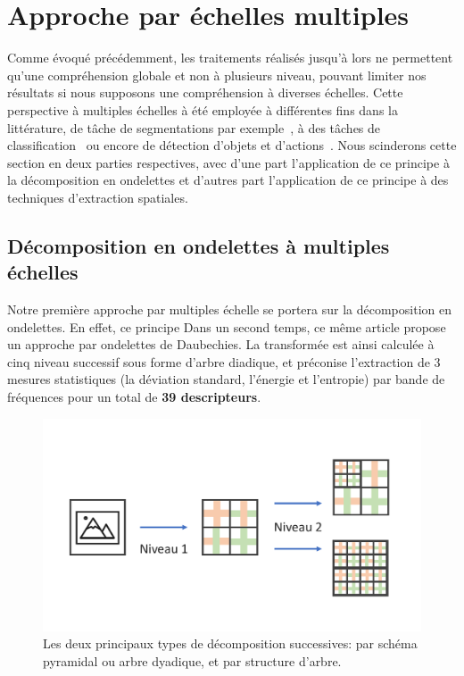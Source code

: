 \section{Approche par échelles multiples}
Comme évoqué précédemment, les traitements réalisés jusqu'à lors ne permettent qu'une compréhension globale et non à plusieurs niveau, pouvant limiter nos résultats si nous supposons une compréhension à diverses échelles. Cette perspective à multiples échelles à été employée à différentes fins dans la littérature, de tâche de segmentations par exemple~\cite{Santos2012}, à des tâches de classification~\cite{Alsaih2016} ou encore de détection d'objets et d'actions~\cite{Pedersoli2011}. Nous scinderons cette section en deux parties respectives, avec d'une part l'application de ce principe à la décomposition en ondelettes et d'autres part l'application de ce principe à des techniques d'extraction spatiales.\par 

\subsection{Décomposition en ondelettes à multiples échelles}
Notre première approche par multiples échelle se portera sur la décomposition en ondelettes. En effet, ce principe \cite{Carvalho2004}
Dans un second temps, ce même article propose un approche par ondelettes de Daubechies. La transformée est ainsi calculée à cinq niveau successif sous forme d'arbre diadique, et préconise l'extraction de 3 mesures statistiques (la déviation standard, l'énergie et l'entropie) par bande de fréquences pour un total de \textbf{39 descripteurs}.\par

\begin{figure}[H]
    \centering
    \includegraphics[width=\textwidth]{contents/chapter_5/resources/scheme_dwt_decomposition.pdf}
    \caption{Les deux principaux types de décomposition successives: par schéma pyramidal ou arbre dyadique, et par structure d'arbre.}
    \label{fig:scheme_dwt_decomposition}
\end{figure}\par

